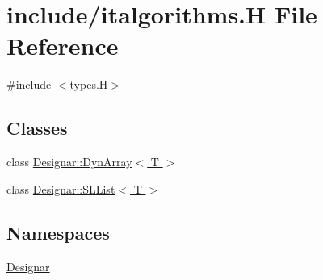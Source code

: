 \hypertarget{italgorithms_8_h}{}\section{include/italgorithms.H File Reference}
\label{italgorithms_8_h}
{\ttfamily \#include $<$types.\+H$>$}\newline
\subsection*{Classes}
\begin{DoxyCompactItemize}
\item 
class \hyperlink{class_designar_1_1_dyn_array}{Designar\+::\+Dyn\+Array$<$ T $>$}
\item 
class \hyperlink{class_designar_1_1_s_l_list}{Designar\+::\+S\+L\+List$<$ T $>$}
\end{DoxyCompactItemize}
\subsection*{Namespaces}
\begin{DoxyCompactItemize}
\item 
 \hyperlink{namespace_designar}{Designar}
\end{DoxyCompactItemize}
